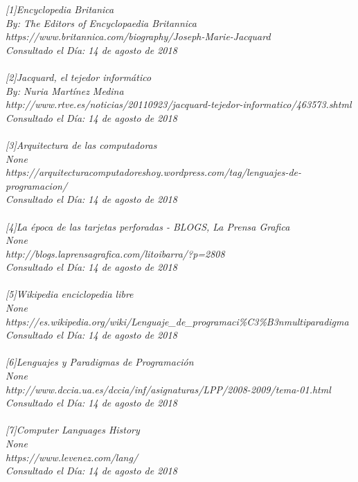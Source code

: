 \documentclass{article}
\begin{document}

\begin{thebibliography}{X}
\textit{[1]Encyclopedia Britanica}\\
\textit{By: The Editors of Encyclopaedia Britannica}\\
\textit{https://www.britannica.com/biography/Joseph-Marie-Jacquard}\\
\textit{Consultado el Día: 14 de agosto de 2018}\\
\\
\textit{[2]Jacquard, el tejedor informático}\\
\textit{By: Nuria Martínez Medina}\\
\textit{http://www.rtve.es/noticias/20110923/jacquard-tejedor-informatico/463573.shtml}\\
\textit{Consultado el Día: 14 de agosto de 2018}\\
\\
\textit{[3]Arquitectura de las computadoras}\\
\textit{None}\\
\textit{https://arquitecturacomputadoreshoy.wordpress.com/tag/lenguajes-de-programacion/}\\
\textit{Consultado el Día: 14 de agosto de 2018}\\
\\
\textit{[4]La época de las tarjetas perforadas - BLOGS, La Prensa Grafica}\\
\textit{None}\\
\textit{ http://blogs.laprensagrafica.com/litoibarra/?p=2808}\\
\textit{Consultado el Día: 14 de agosto de 2018}\\
\\
\textit{[5]Wikipedia enciclopedia libre}\\
\textit{None}\\
\textit{https://es.wikipedia.org/wiki/Lenguaje_de_programaci\%C3\%B3nmultiparadigma}\\
\textit{Consultado el Día: 14 de agosto de 2018}\\
\\
\textit{[6]Lenguajes y Paradigmas de Programación}\\
\textit{None}\\
\textit{http://www.dccia.ua.es/dccia/inf/asignaturas/LPP/2008-2009/tema-01.html}\\
\textit{Consultado el Día: 14 de agosto de 2018}\\
\\
\textit{[7]Computer Languages History}\\
\textit{None}\\
\textit{https://www.levenez.com/lang/}\\
\textit{Consultado el Día: 14 de agosto de 2018}\\

\end{thebibliography}
\end{document}
